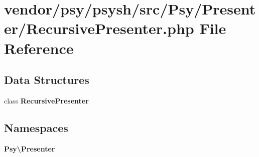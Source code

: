 \section{vendor/psy/psysh/src/\+Psy/\+Presenter/\+Recursive\+Presenter.php File Reference}
\label{_recursive_presenter_8php}
\subsection*{Data Structures}
\begin{DoxyCompactItemize}
\item 
class {\bf Recursive\+Presenter}
\end{DoxyCompactItemize}
\subsection*{Namespaces}
\begin{DoxyCompactItemize}
\item 
 {\bf Psy\textbackslash{}\+Presenter}
\end{DoxyCompactItemize}
